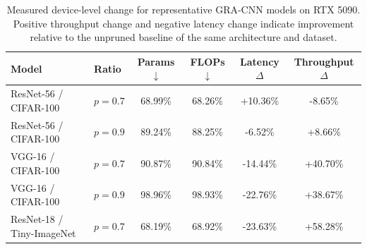 \begin{table}[t]
\caption{Measured device-level change for representative GRA-CNN models on RTX 5090. Positive throughput change and negative latency change indicate improvement relative to the unpruned baseline of the same architecture and dataset.}
\label{tab:latency_profile_local}
\scriptsize
\setlength{\tabcolsep}{3.2pt}
\begin{tabular*}{\linewidth}{@{\extracolsep\fill}llcccc}
\toprule
Model & Ratio & Params $\downarrow$ & FLOPs $\downarrow$ & Latency $\Delta$ & Throughput $\Delta$ \\
\midrule
ResNet-56 / CIFAR-100 & $p=0.7$ & 68.99\% & 68.26\% & +10.36\% & -8.65\% \\
ResNet-56 / CIFAR-100 & $p=0.9$ & 89.24\% & 88.25\% & -6.52\% & +8.66\% \\
VGG-16 / CIFAR-100 & $p=0.7$ & 90.87\% & 90.84\% & -14.44\% & +40.70\% \\
VGG-16 / CIFAR-100 & $p=0.9$ & 98.96\% & 98.93\% & -22.76\% & +38.67\% \\
ResNet-18 / Tiny-ImageNet & $p=0.7$ & 68.19\% & 68.92\% & -23.63\% & +58.28\% \\
\bottomrule
\end{tabular*}
\end{table}
